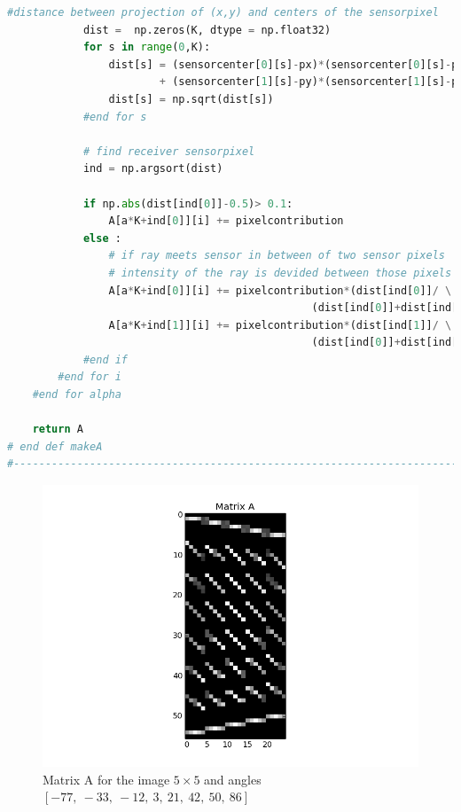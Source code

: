 \documentclass{article}
\begin{document}
\begin{lstlisting}[language=Python]
            #distance between projection of (x,y) and centers of the sensorpixel
            dist =  np.zeros(K, dtype = np.float32)
            for s in range(0,K):
                dist[s] = (sensorcenter[0][s]-px)*(sensorcenter[0][s]-px)\
                        + (sensorcenter[1][s]-py)*(sensorcenter[1][s]-py)
                dist[s] = np.sqrt(dist[s])
            #end for s
            
            # find receiver sensorpixel
            ind = np.argsort(dist)

            if np.abs(dist[ind[0]]-0.5)> 0.1:
                A[a*K+ind[0]][i] += pixelcontribution
            else :
                # if ray meets sensor in between of two sensor pixels                          
                # intensity of the ray is devided between those pixels
                A[a*K+ind[0]][i] += pixelcontribution*(dist[ind[0]]/ \
                                                (dist[ind[0]]+dist[ind[1]]))
                A[a*K+ind[1]][i] += pixelcontribution*(dist[ind[1]]/ \
                                                (dist[ind[0]]+dist[ind[1]]))
            #end if                
        #end for i
    #end for alpha  
                
    return A
# end def makeA    
#-----------------------------------------------------------------------------
\end{lstlisting}


\begin{figure}[ht]
        \centering
        \includegraphics[width=\textwidth]{../matrixA.png}
        \caption{Matrix A for the image $5\times5$ and angles $[-77,\ -33,\ -12,\ 3,\ 21,\ 42,\ 50,\ 86]$ }
        \label{img1}
\end{figure}
\FloatBarrier
\end{document}
